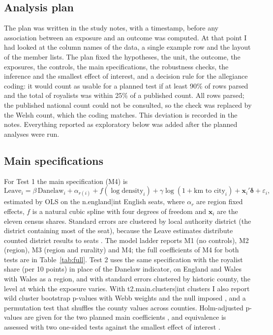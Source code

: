 \documentclass[11pt,a4paper]{article}
\begin{document}
\subsection{Analysis plan}
The plan was written in the study notes, with a timestamp, before any association between an exposure and an outcome was computed. At that point I had looked at the column names of the data, a single example row and the layout of the member lists. The plan fixed the hypotheses, the unit, the outcome, the exposures, the controls, the main specifications, the robustness checks, the inference and the smallest effect of interest, and a decision rule for the allegiance coding: it would count as usable for a planned test if at least 90\% of rows parsed and the total of royalists was within 25\% of a published count. All rows parsed; the published national count could not be consulted, so the check was replaced by the Welsh count, which the coding matches. This deviation is recorded in the notes. Everything reported as exploratory below was added after the planned analyses were run.

\subsection{Main specifications}
For Test 1 the main specification (M4) is
\begin{equation}
\text{Leave}_i = \beta\,\text{Danelaw}_i + \alpha_{r(i)} + f(\log \text{density}_i) + \gamma \log(1+\text{km to city}_i) + \mathbf{x}_i'\boldsymbol\delta + \varepsilon_i,
\end{equation}
estimated by OLS on the {{n.england|int}} English seats, where $\alpha_r$ are region fixed effects, $f$ is a natural cubic spline with four degrees of freedom and $\mathbf{x}_i$ are the eleven census shares. Standard errors are clustered by local authority district (the district containing most of the seat), because the Leave estimates distribute counted district results to seats \citep{hanretty2017,cameron2015}. The model ladder reports M1 (no controls), M2 (region), M3 (region and rurality) and M4; the full coefficients of M4 for both tests are in Table~\ref{tab:full}. Test 2 uses the same specification with the royalist share (per 10 points) in place of the Danelaw indicator, on England and Wales with Wales as a region, and with standard errors clustered by historic county, the level at which the exposure varies. With {{t2.main.clusters|int}} clusters I also report wild cluster bootstrap p-values with Webb weights and the null imposed \citep{cameron2008,webb2023}, and a permutation test that shuffles the county values across counties. Holm-adjusted p-values are given for the two planned main coefficients \citep{holm1979}, and equivalence is assessed with two one-sided tests against the smallest effect of interest \citep{lakens2017}.
\end{document}
